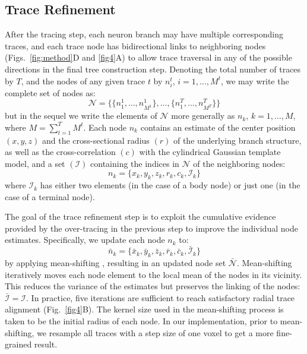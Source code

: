 \subsection{Trace Refinement}
\label{subsec:trace-refinement}
After the tracing step, each neuron branch may have multiple corresponding traces, and each trace node has bidirectional links to neighboring nodes (Figs.~\ref{fig:method}D and \ref{fig4}A) to allow trace traversal in any of the possible directions in the final tree construction step. Denoting the total number of traces by $T$, and the nodes of any given trace $t$ by $n_i^t$, $i=1,\dots,M^t$, we may write the complete set of nodes as:
\begin{equation}
\label{eq:N}
\mathcal{N} = \bigg\{
\Big\{ n_1^1,\dots,n_{M^1}^1\Big\},
\dots,
\Big\{ n_1^T,\dots,n_{M^T}^T\Big\}
\bigg\}
\end{equation}
but in the sequel we write the elements of $\mathcal{N}$ more generally as $n_k$, $k=1,\dots,M$, where $M=\sum_{t=1}^{T}M^t$. Each node $n_k$ contains an estimate of the center position $\left(x,y,z\right)$ and the cross-sectional radius $\left(r\right)$ of the underlying branch structure, as well as the cross-correlation $\left(c\right)$ with the cylindrical Gaussian template model, and a set $\left( \mathcal{I} \right)$ containing the indices in $\mathcal{N}$ of the neighboring nodes:
\begin{equation}
\label{eq:n_k}
n_k = \lbrace x_k, y_k, z_k, r_k, c_k, \mathcal{I}_k \rbrace
\end{equation}
where $\mathcal{I}_k$ has either two elements (in the case of a body node) or just one (in the case of a terminal node).

The goal of the trace refinement step is to exploit the cumulative evidence provided by the over-tracing in the previous step to improve the individual node estimates. Specifically, we update each node $n_k$ to:
\begin{equation}
\label{eq:bar_n_k}
\bar{n}_k = \lbrace \bar{x}_k, \bar{y}_k, \bar{z}_k, \bar{r}_k, \bar{c}_k, \bar{\mathcal{I}}_k \rbrace
\end{equation}
by applying mean-shifting \cite{cheng1995mean}, resulting in an updated node set $\bar{\mathcal{N}}$. Mean-shifting iteratively moves each node element to the local mean of the nodes in its vicinity. This reduces the variance of the estimates but preserves the linking of the nodes: $\bar{\mathcal{I}}=\mathcal{I}$. In practice, five iterations are sufficient to reach satisfactory radial trace alignment (Fig.~\ref{fig4}B). The kernel size used in the mean-shifting process is taken to be the initial radius of each node. In our implementation, prior to mean-shifting, we resample all traces with a step size of one voxel to get a more fine-grained result.

